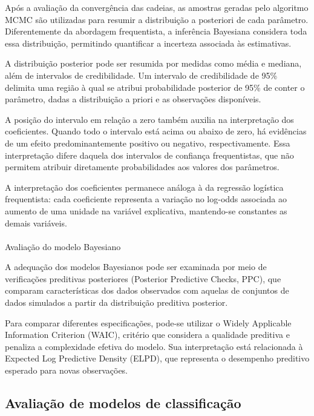 \documentclass[
  brazilian,
  12pt,
  letterpaper,
  DIV=11,
  numbers=noendperiod]{scrartcl}
\makeatletter
\let\oldparagraph\paragraph
\renewcommand{\paragraph}{
    \@ifstar
      \xxxParagraphStar
      \xxxParagraphNoStar
  }
\newcommand{\xxxParagraphStar}[1]{\oldparagraph*{#1}\mbox{}}
\newcommand{\xxxParagraphNoStar}[1]{\oldparagraph{#1}\mbox{}}
\makeatother
\begin{document}
Após a avaliação da convergência das cadeias, as amostras geradas pelo
algoritmo MCMC são utilizadas para resumir a distribuição a posteriori
de cada parâmetro. Diferentemente da abordagem frequentista, a
inferência Bayesiana considera toda essa distribuição, permitindo
quantificar a incerteza associada às estimativas.

A distribuição posterior pode ser resumida por medidas como média e
mediana, além de intervalos de credibilidade. Um intervalo de
credibilidade de 95\% delimita uma região à qual se atribui
probabilidade posterior de 95\% de conter o parâmetro, dadas a
distribuição a priori e as observações disponíveis.

A posição do intervalo em relação a zero também auxilia na interpretação
dos coeficientes. Quando todo o intervalo está acima ou abaixo de zero,
há evidências de um efeito predominantemente positivo ou negativo,
respectivamente. Essa interpretação difere daquela dos intervalos de
confiança frequentistas, que não permitem atribuir diretamente
probabilidades aos valores dos parâmetros.

A interpretação dos coeficientes permanece análoga à da regressão
logística frequentista: cada coeficiente representa a variação no
log-odds associada ao aumento de uma unidade na variável explicativa,
mantendo-se constantes as demais variáveis.

\paragraph{Avaliação do modelo
Bayesiano}\label{avaliauxe7uxe3o-do-modelo-bayesiano}

A adequação dos modelos Bayesianos pode ser examinada por meio de
verificações preditivas posteriores (Posterior Predictive Checks, PPC),
que comparam características dos dados observados com aquelas de
conjuntos de dados simulados a partir da distribuição preditiva
posterior.

Para comparar diferentes especificações, pode-se utilizar o Widely
Applicable Information Criterion (WAIC), critério que considera a
qualidade preditiva e penaliza a complexidade efetiva do modelo. Sua
interpretação está relacionada à Expected Log Predictive Density (ELPD),
que representa o desempenho preditivo esperado para novas observações.

\subsection{Avaliação de modelos de
classificação}\label{avaliauxe7uxe3o-de-modelos-de-classificauxe7uxe3o}
\end{document}
